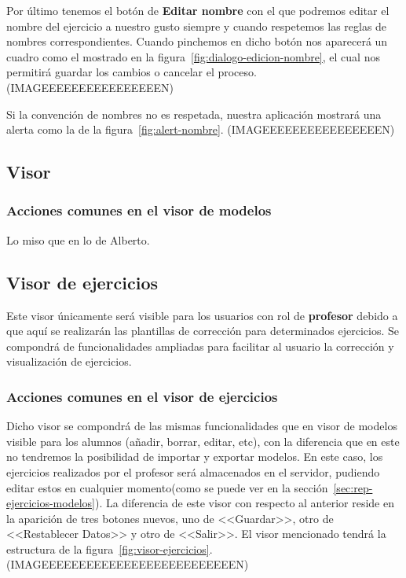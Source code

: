 Por último tenemos el botón de \textbf{Editar nombre} con el que podremos editar el nombre del ejercicio a nuestro gusto siempre y cuando respetemos las reglas de nombres correspondientes. Cuando pinchemos en dicho botón nos aparecerá un cuadro como el mostrado en la figura~\ref{fig:dialogo-edicion-nombre}, el cual nos permitirá guardar los cambios o cancelar el proceso.
(IMAGEEEEEEEEEEEEEEEEN)

Si la convención de nombres no es respetada, nuestra aplicación mostrará una alerta como la de la figura~\ref{fig:alert-nombre}.
(IMAGEEEEEEEEEEEEEEEEN)

\subsection{Visor}
\subsubsection{Acciones comunes en el visor de modelos}
Lo miso que en lo de Alberto.

\subsection{Visor de ejercicios}\label{sec:visor-ejercicios}
Este visor únicamente será visible para los usuarios con rol de \textbf{profesor} debido a que aquí se realizarán las plantillas de corrección para determinados ejercicios. Se compondrá de funcionalidades ampliadas para facilitar al usuario la corrección y visualización de ejercicios.

\subsubsection{Acciones comunes en el visor de ejercicios}
Dicho visor se compondrá de las mismas funcionalidades que en visor de modelos visible para los alumnos (añadir, borrar, editar, etc), con la diferencia que en este no tendremos la posibilidad de importar y exportar modelos. En este caso, los ejercicios realizados por el profesor será almacenados en el servidor, pudiendo editar estos en cualquier momento(como se puede ver en la sección~\ref{sec:rep-ejercicios-modelos}). La diferencia de este visor con respecto al anterior reside en la aparición de tres botones nuevos, uno de <<Guardar>>, otro de <<Restablecer Datos>> y otro de <<Salir>>. El visor mencionado tendrá la estructura de la figura~\ref{fig:visor-ejercicios}.
(IMAGEEEEEEEEEEEEEEEEEEEEEEEEEEN)

